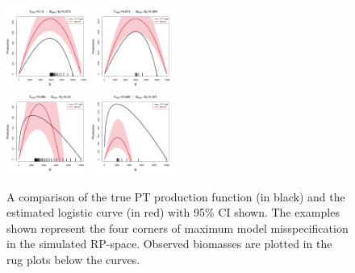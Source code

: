 \documentclass[12pt]{article}
\begin{document}
\begin{figure}
\vspace{-0.5cm}
\includegraphics[width=0.24\textwidth]{../ptNew/srrCompareFlatT30X0.12Z0.573.png}
\includegraphics[width=0.24\textwidth]{../ptNew/srrCompareFlatT30X0.674Z0.599.png}\\
\includegraphics[width=0.24\textwidth]{../ptNew/srrCompareFlatT30X0.096Z0.22.png}
\includegraphics[width=0.24\textwidth]{../ptNew/srrCompareFlatT30X0.699Z0.201.png}
\caption{
A comparison of the true PT production function (in black) and the estimated logistic curve (in red)
with 95\% CI shown. The examples shown represent the four corners of maximum model misspecification
in the simulated RP-space. Observed biomasses are plotted in the rug plots below the curves.
}
\label{flatProd}
\end{figure}
\end{document}
